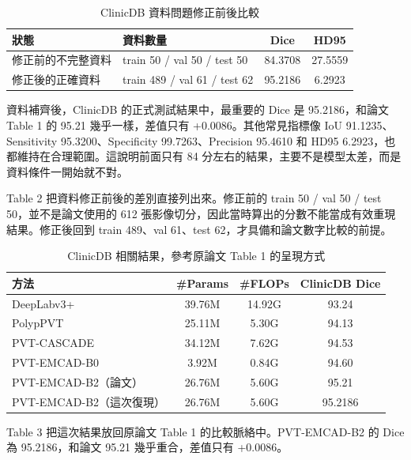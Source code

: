 \documentclass[a4paper,12pt,twocolumn]{article}
\begin{document}
\begin{table}[t]
\centering
\caption{ClinicDB 資料問題修正前後比較}
\scriptsize
\setlength{\tabcolsep}{7pt}
\renewcommand{\arraystretch}{1.18}
\begin{tabular}{l l c c}
\toprule
\textbf{狀態} & \textbf{資料數量} & \textbf{Dice} & \textbf{HD95} \\
\midrule
修正前的不完整資料 & train 50 / val 50 / test 50 & 84.3708 & 27.5559 \\
修正後的正確資料 & train 489 / val 61 / test 62 & 95.2186 & 6.2923 \\
\bottomrule
\end{tabular}
\end{table}

資料補齊後，ClinicDB 的正式測試結果中，最重要的 Dice 是 95.2186，和論文 Table 1 的 95.21 幾乎一樣，差值只有 +0.0086。其他常見指標像 IoU 91.1235、Sensitivity 95.3200、Specificity 99.7263、Precision 95.4610 和 HD95 6.2923，也都維持在合理範圍。這說明前面只有 84 分左右的結果，主要不是模型太差，而是資料條件一開始就不對。

Table 2 把資料修正前後的差別直接列出來。修正前的 train 50 / val 50 / test 50，並不是論文使用的 612 張影像切分，因此當時算出的分數不能當成有效重現結果。修正後回到 train 489、val 61、test 62，才具備和論文數字比較的前提。

\begin{table}[t]
\centering
\caption{ClinicDB 相關結果，參考原論文 Table 1 的呈現方式}
\scriptsize
\setlength{\tabcolsep}{8pt}
\renewcommand{\arraystretch}{1.18}
\begin{tabular}{l c c c}
\toprule
\textbf{方法} & \textbf{\#Params} & \textbf{\#FLOPs} & \textbf{ClinicDB Dice} \\
\midrule
DeepLabv3+ & 39.76M & 14.92G & 93.24 \\
PolypPVT & 25.11M & 5.30G & 94.13 \\
PVT-CASCADE & 34.12M & 7.62G & 94.53 \\
PVT-EMCAD-B0 & 3.92M & 0.84G & 94.60 \\
PVT-EMCAD-B2（論文） & 26.76M & 5.60G & 95.21 \\
PVT-EMCAD-B2（這次復現） & 26.76M & 5.60G & 95.2186 \\
\bottomrule
\end{tabular}
\end{table}

Table 3 把這次結果放回原論文 Table 1 的比較脈絡中。PVT-EMCAD-B2 的 Dice 為 95.2186，和論文 95.21 幾乎重合，差值只有 +0.0086。
\end{document}
